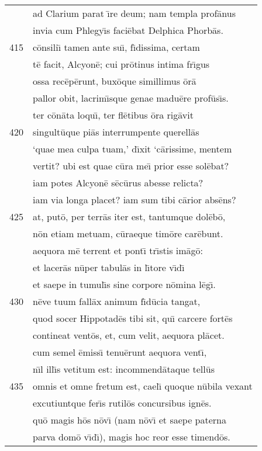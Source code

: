\documentclass[paper=6in:9in,pagesize=pdftex,
               headinclude=on,footinclude=on,12pt]{scrbook}
\begin{document}
\begin{longtable}[p]{ r l }
 & ad Clarium parat \={\i}re deum; nam templa prof\=anus\\ 
 & invia cum Phlegy\={\i}s faci\=ebat Delphica Phorb\=as.\\ 
415 & c\=onsili\={\i} tamen ante su\={\i}, f\={\i}dissima, certam\\ 
 & t\=e facit, Alcyon\=e; cui pr\=otinus intima fr\={\i}gus\\ 
 & ossa rec\=ep\=erunt, bux\=oque simillimus \=or\=a\\ 
 & pallor obit, lacrim\={\i}sque genae madu\=ere prof\=us\={\i}s.\\ 
 & ter c\=on\=ata loqu\={\i}, ter fl\=etibus \=ora rig\=avit\\ 
420 & singult\=uque pi\=as interrumpente querell\=as\\ 
 & `quae mea culpa tuam,' d\={\i}xit `c\=arissime, mentem\\ 
 & vertit? ubi est quae c\=ura me\={\i} prior esse sol\=ebat?\\ 
 & iam potes Alcyon\=e s\=ec\=urus abesse relicta?\\ 
 & iam via longa placet? iam sum tibi c\=arior abs\=ens?\\ 
425 & at, put\=o, per terr\=as iter est, tantumque dol\=eb\=o,\\ 
 & n\=on etiam metuam, c\=uraeque tim\=ore car\=ebunt.\\ 
 & aequora m\=e terrent et pont\={\i} tr\={\i}stis im\=ag\=o:\\ 
 & et lacer\=as n\=uper tabul\=as in l\={\i}tore v\={\i}d\={\i}\\ 
 & et saepe in tumul\={\i}s sine corpore n\=omina l\=eg\={\i}.\\ 
430 & n\=eve tuum fall\=ax animum f\={\i}d\=ucia tangat,\\ 
 & quod socer Hippotad\=es tibi sit, qu\={\i} carcere fort\=es\\ 
 & contineat vent\=os, et, cum velit, aequora pl\=acet.\\ 
 & cum semel \=emiss\={\i} tenu\=erunt aequora vent\={\i},\\ 
 & n\={\i}l ill\={\i}s vetitum est: incommend\=ataque tell\=us\\ 
435 & omnis et omne fretum est, cael\={\i} quoque n\=ubila vexant\\ 
 & excutiuntque fer\={\i}s rutil\=os concursibus ign\=es.\\ 
 & qu\=o magis h\=os n\=ov\={\i} (nam n\=ov\={\i} et saepe paterna\\ 
 & parva dom\=o v\={\i}d\={\i}), magis hoc reor esse timend\=os.\\ 

\end{longtable}
\end{document}
